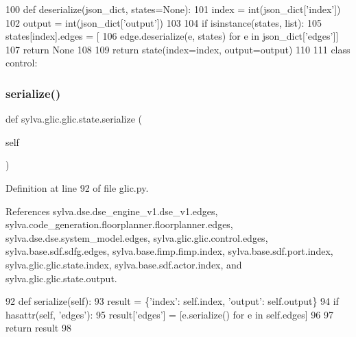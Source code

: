 \begin{DoxyCode}
100     \textcolor{keyword}{def }deserialize(json\_dict, states=None):
101       index = int(json\_dict[\textcolor{stringliteral}{'index'}])
102       output = int(json\_dict[\textcolor{stringliteral}{'output'}])
103 
104       \textcolor{keywordflow}{if} isinstance(states, list):
105         states[index].edges = [
106             edge.deserialize(e, states) \textcolor{keywordflow}{for} e \textcolor{keywordflow}{in} json\_dict[\textcolor{stringliteral}{'edges'}]]
107         \textcolor{keywordflow}{return} \textcolor{keywordtype}{None}
108 
109       \textcolor{keywordflow}{return} state(index=index, output=output)
110 
111   \textcolor{keyword}{class }control:
\end{DoxyCode}
\mbox{\label{classsylva_1_1glic_1_1glic_1_1state_a09708ff3d56142db919a172a0cb849e1}} 
\subsubsection{\texorpdfstring{serialize()}{serialize()}}
{\footnotesize\ttfamily def sylva.\+glic.\+glic.\+state.\+serialize (\begin{DoxyParamCaption}\item[{}]{self }\end{DoxyParamCaption})}



Definition at line 92 of file glic.\+py.



References sylva.\+dse.\+dse\+\_\+engine\+\_\+v1.\+dse\+\_\+v1.\+edges, sylva.\+code\+\_\+generation.\+floorplanner.\+floorplanner.\+edges, sylva.\+dse.\+dse.\+system\+\_\+model.\+edges, sylva.\+glic.\+glic.\+control.\+edges, sylva.\+base.\+sdf.\+sdfg.\+edges, sylva.\+base.\+fimp.\+fimp.\+index, sylva.\+base.\+sdf.\+port.\+index, sylva.\+glic.\+glic.\+state.\+index, sylva.\+base.\+sdf.\+actor.\+index, and sylva.\+glic.\+glic.\+state.\+output.


\begin{DoxyCode}
92     \textcolor{keyword}{def }serialize(self):
93       result = \{\textcolor{stringliteral}{'index'}: self.index, \textcolor{stringliteral}{'output'}: self.output\}
94       \textcolor{keywordflow}{if} hasattr(self, \textcolor{stringliteral}{'edges'}):
95         result[\textcolor{stringliteral}{'edges'}] = [e.serialize() \textcolor{keywordflow}{for} e \textcolor{keywordflow}{in} self.edges]
96 
97       \textcolor{keywordflow}{return} result
98 
\end{DoxyCode}


